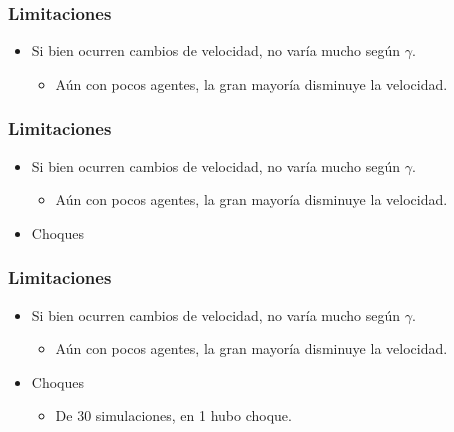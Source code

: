 \documentclass[10pt, compress]{beamer}
\begin{document}
\begin{frame}[fragile]
\frametitle{Limitaciones}

\begin{itemize}
\item Si bien ocurren cambios de velocidad, no var\'ia mucho seg\'un $\gamma$. 
	\begin{itemize}
	\item A\'un con pocos agentes, la gran mayor\'ia disminuye la velocidad.
	\end{itemize}
\end{itemize}
\addtocounter{framenumber}{-1}
\end{frame}

\begin{frame}[fragile]
\frametitle{Limitaciones}

\begin{itemize}
\item Si bien ocurren cambios de velocidad, no var\'ia mucho seg\'un $\gamma$. 
	\begin{itemize}
	\item A\'un con pocos agentes, la gran mayor\'ia disminuye la velocidad.
	\end{itemize}
\item Choques
\end{itemize}
\addtocounter{framenumber}{-1}
\end{frame}

\begin{frame}[fragile]
\frametitle{Limitaciones}

\begin{itemize}
\item Si bien ocurren cambios de velocidad, no var\'ia mucho seg\'un $\gamma$. 
	\begin{itemize}
	\item A\'un con pocos agentes, la gran mayor\'ia disminuye la velocidad.
	\end{itemize}
\item Choques
	\begin{itemize}
	\item De 30 simulaciones, en 1 hubo choque.
	\end{itemize}
\end{itemize}
\addtocounter{framenumber}{-1}
\end{frame}
\end{document}
